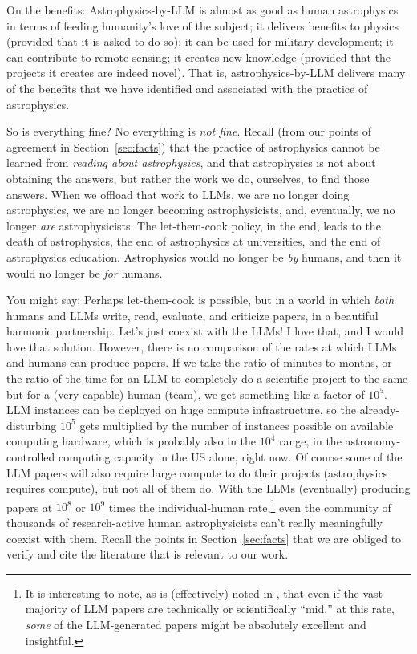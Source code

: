\documentclass{article}
\newcommand{\sectionname}{Section}
\newcommand{\secref}[1]{\sectionname~\ref{#1}}
\begin{document}
On the benefits: Astrophysics-by-LLM is almost as good as human astrophysics in terms of feeding humanity's love of the subject;
it delivers benefits to physics (provided that it is asked to do so);
it can be used for military development;
it can contribute to remote sensing;
it creates new knowledge (provided that the projects it creates are indeed novel).
That is, astrophysics-by-LLM delivers many of the benefits that we have identified and associated with the practice of astrophysics.

So is everything fine? No everything is \emph{not fine}.
Recall (from our points of agreement in \secref{sec:facts}) that the practice of astrophysics cannot be learned from \emph{reading about astrophysics}, and that astrophysics is not about obtaining the answers, but rather the work we do, ourselves, to find those answers.
When we offload that work to LLMs, we are no longer doing astrophysics, we are no longer becoming astrophysicists, and, eventually, we no longer \emph{are} astrophysicists.
The let-them-cook policy, in the end, leads to the death of astrophysics, the end of astrophysics at universities, and the end of astrophysics education.
Astrophysics would no longer be \emph{by} humans, and then it would no longer be \emph{for} humans.

You might say: Perhaps let-them-cook is possible, but in a world in which \emph{both} humans and LLMs write, read, evaluate, and criticize papers, in a beautiful harmonic partnership.
Let's just coexist with the LLMs!
I love that, and I would love that solution.
However, there is no comparison of the rates at which LLMs and humans can produce papers.
If we take the ratio of minutes to months, or the ratio of the time for an LLM to completely do a scientific project to the same but for a (very capable) human (team), we get something like a factor of $10^5$.
LLM instances can be deployed on huge compute infrastructure, so the already-disturbing $10^5$ gets multiplied by the number of instances possible on available computing hardware, which is probably also in the $10^4$ range, in the astronomy-controlled computing capacity in the US alone, right now.
Of course some of the LLM papers will also require large compute to do their projects (astrophysics requires compute), but not all of them do.
With the LLMs (eventually) producing papers at $10^8$ or $10^9$ times the individual-human rate,\footnote{%
It is interesting to note, as is (effectively) noted in \cite{denario}, that even if the vast majority of LLM papers are technically or scientifically ``mid,'' at this rate, \emph{some} of the LLM-generated papers might be absolutely excellent and insightful.}
even the community of thousands of research-active human astrophysicists can't really meaningfully coexist with them.
Recall the points in \secref{sec:facts} that we are obliged to verify and cite the literature that is relevant to our work.
\end{document}
